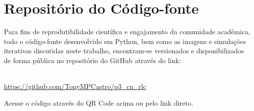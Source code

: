 \documentclass[11pt, a4paper]{article}
\begin{document}
\clearpage

\section*{Repositório do Código-fonte}

Para fins de reprodutibilidade científica e engajamento da comunidade acadêmica, todo o código-fonte desenvolvido em Python, bem como as imagens e simulações iterativas discutidas neste trabalho, encontram-se versionados e disponibilizados de forma pública no repositório do GitHub através do link: 

\begin{center}
     \\
    
    \vspace{0.5cm}
    \url{https://github.com/TonyMPCastro/p3_cn_rlc}
\end{center}

Acesse o código através do QR Code acima ou pelo link direto.
\end{document}
